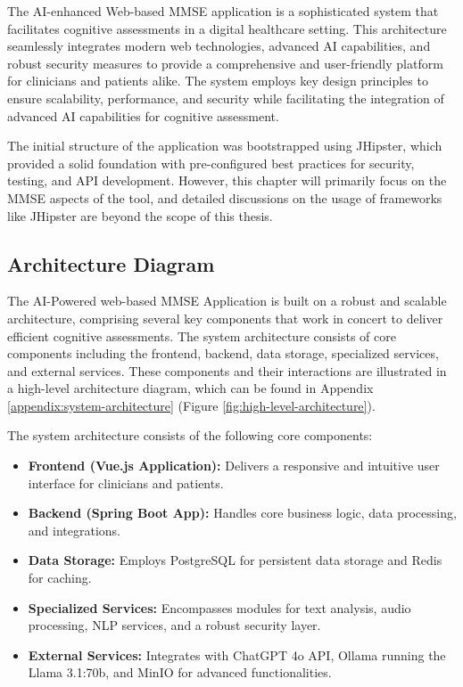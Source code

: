 The AI-enhanced Web-based MMSE application is a sophisticated system that facilitates cognitive assessments in a digital healthcare setting. This architecture seamlessly integrates modern web technologies, advanced AI capabilities, and robust security measures to provide a comprehensive and user-friendly platform for clinicians and patients alike. The system employs key design principles to ensure scalability, performance, and security while facilitating the integration of advanced AI capabilities for cognitive assessment.

The initial structure of the application was bootstrapped using JHipster, which provided a solid foundation with pre-configured best practices for security, testing, and API development. However, this chapter will primarily focus on the MMSE aspects of the tool, and detailed discussions on the usage of frameworks like JHipster are beyond the scope of this thesis.

\subsection{Architecture Diagram}
The AI-Powered web-based MMSE Application is built on a robust and scalable architecture, comprising several key components that work in concert to deliver efficient cognitive assessments. The system architecture consists of core components including the frontend, backend, data storage, specialized services, and external services. These components and their interactions are illustrated in a high-level architecture diagram, which can be found in Appendix \ref{appendix:system-architecture} (Figure \ref{fig:high-level-architecture}).

The system architecture consists of the following core components:
\begin{itemize}
\item \textbf{Frontend (Vue.js Application):} Delivers a responsive and intuitive user interface for clinicians and patients.
\item \textbf{Backend (Spring Boot App):} Handles core business logic, data processing, and integrations.
\item \textbf{Data Storage:} Employs PostgreSQL for persistent data storage and Redis for caching.
\item \textbf{Specialized Services:} Encompasses modules for text analysis, audio processing, NLP services, and a robust security layer.
\item \textbf{External Services:} Integrates with ChatGPT 4o API, Ollama running the Llama 3.1:70b, and MinIO for advanced functionalities.
\end{itemize}


